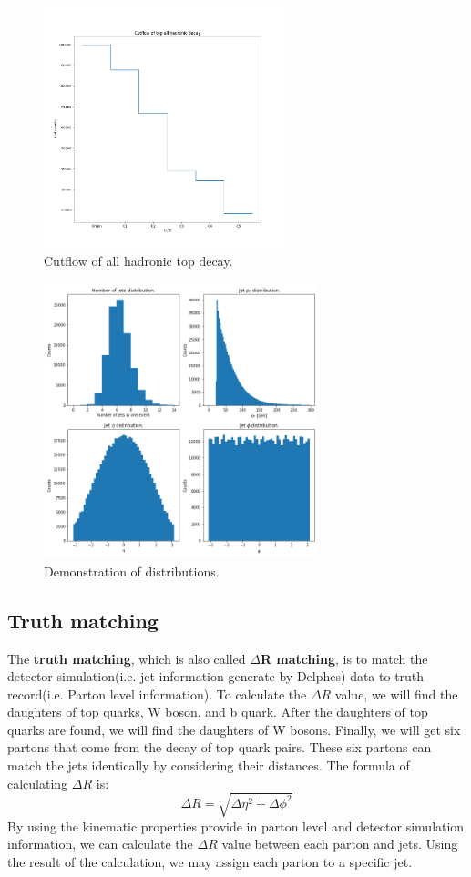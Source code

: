 \begin{figure}[!h]
	\includegraphics[width=0.8\linewidth, height=7cm,keepaspectratio=true]{Figures/ttbar_cutflow.png}
	\caption{Cutflow of all hadronic top decay.}
	\label{fig:cutflow}
\end{figure}
\begin{figure}[H]
	\includegraphics[width=0.8\linewidth, height=8cm,keepaspectratio=true]{Figures/ttbar_kinematic_dist.png}
	\caption{Demonstration of distributions.}
	\label{fig:kinematic dist}
\end{figure}
\newpage

\subsection{Truth matching}\label{subsec:Truth matching}
The \textbf{truth matching}, which is also called \textbf{$\Delta$R matching},  is to match the detector simulation(i.e. jet information generate by Delphes) data to truth record(i.e. Parton level information).  To calculate the $\Delta R$ value, we will find the daughters of top quarks, W boson, and b quark. After the daughters of top quarks are found, we will find the daughters of W bosons. Finally, we will get six partons that come from the decay of top quark pairs. These six partons can match the jets identically by considering their distances. The formula of calculating $\Delta R$ is:
\\
\begin{equation}
	\Delta R = \sqrt{\Delta\eta^{2} + \Delta\phi^{2}}
\end{equation}
By using the kinematic properties provide in parton level and detector simulation information, we can calculate the $\Delta R$ value between each parton and jets. Using the result of the calculation, we may assign each parton to a specific jet. 
\\
